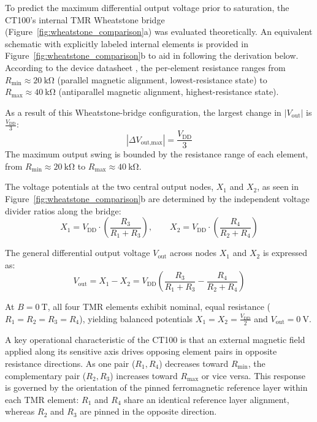 \documentclass[12pt,a4paper]{article}
\begin{document}
To predict the maximum differential output voltage prior to saturation, the CT100's internal TMR Wheatstone bridge (Figure~\ref{fig:wheatstone_comparison}a) was evaluated theoretically. An equivalent schematic with explicitly labeled internal elements is provided in Figure~\ref{fig:wheatstone_comparison}b to aid in following the derivation below.  According to the device datasheet \cite{ct100_datasheet}, the per-element resistance ranges from $R_{\min} \approx \SI{20}{\kilo\ohm}$ (parallel magnetic alignment, lowest-resistance state) to $R_{\max} \approx \SI{40}{\kilo\ohm}$ (antiparallel magnetic alignment, highest-resistance state). 

As a result of this Wheatstone-bridge configuration, the largest change in $\left|V_{\text{out}} \right|$ is $\frac{V_{\text{DD}}}{3}$:
\begin{equation}
   \left| \Delta V_{\text{out,max}} \right| = \frac{V_{\text{DD}}}{3}
\end{equation}
The maximum output swing is bounded by the resistance range of each element, from $R_{\min} \approx \SI{20}{\kilo\ohm}$ to $R_{\max} \approx \SI{40}{\kilo\ohm}$.

The voltage potentials at the two central output nodes, $X_1$ and $X_2$, as seen in Figure~\ref{fig:wheatstone_comparison}b are determined by the independent voltage divider ratios along the bridge:
\begin{equation}
    X_1 = V_{\text{DD}} \cdot \left( \frac{R_3}{R_1 + R_3} \right), \qquad X_2 = V_{\text{DD}} \cdot \left( \frac{R_4}{R_2 + R_4} \right)
    \label{eq:node_voltages}
\end{equation}

The general differential output voltage $V_{\text{out}}$ across nodes $X_1$ and $X_2$ is expressed as:
\begin{equation}
    V_{\text{out}} = X_1 - X_2 = V_{\text{DD}} \left( \frac{R_3}{R_1 + R_3} - \frac{R_4}{R_2 + R_4} \right)
    \label{eq:vout_general}
\end{equation}

At $B = \SI{0}{\tesla}$, all four TMR elements exhibit nominal, equal resistance ($R_1 = R_2 = R_3 = R_4$), yielding balanced potentials $X_1 = X_2 = \frac{V_{\text{DD}}}{2}$ and $V_{\text{out}} = \SI{0}{\volt}$. 

A key operational characteristic of the CT100 is that an external magnetic field applied along its sensitive axis drives opposing element pairs in opposite resistance directions. As one pair (\(R_1, R_4\)) decreases toward \(R_{\min}\), the complementary pair (\(R_2, R_3\)) increases toward \(R_{\max}\) or vice versa. This response is governed by the orientation of the pinned ferromagnetic reference layer within each TMR element: \(R_1\) and \(R_4\) share an identical reference layer alignment, whereas \(R_2\) and \(R_3\) are pinned in the opposite direction.
\end{document}
